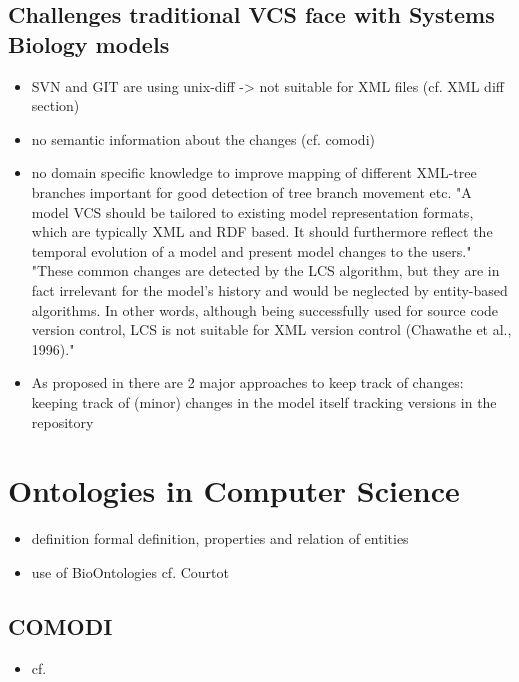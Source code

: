 	\subsection{Challenges traditional VCS face with Systems Biology models}
	\begin{itemize}
		\item SVN and GIT are using unix-diff -> not suitable for XML files (cf. XML diff section)
		\item no semantic information about the changes (cf. comodi)
		\item no domain specific knowledge to improve mapping of different XML-tree branches
			\subitem important for good detection of tree branch movement etc. 
			\subitem "A model VCS should be tailored to existing model representation formats, which are typically XML and RDF based. It should furthermore reflect the temporal evolution of a model and present model changes to the users." \cite{Waltemath2013}
			\subitem "These
			common changes are detected by the LCS algorithm, but they are in fact irrelevant for the model’s history and would be neglected by entity-based algorithms. In other words, although being successfully used for source code version control, LCS is not suitable for XML version control (Chawathe et al., 1996)." \cite{Waltemath2013}
		\item As proposed in \cite{Waltemath2013} there are 2 major approaches to keep track of changes:
			\subitem keeping track of (minor) changes in the model itself
			\subitem tracking versions in the repository
	\end{itemize}


\section{Ontologies in Computer Science}

	\begin{itemize}
	\item definition
		\subitem formal definition, properties and relation of entities
	\item use of BioOntologies cf. Courtot
	\end{itemize}

	
	\subsection{COMODI}
	\begin{itemize}
		\item cf. \cite{Scharm2016}
	\end{itemize}
	
